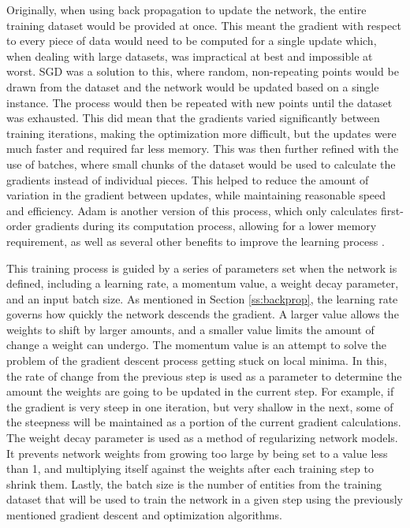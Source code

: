 \documentclass[11pt,a4paper,oldfontcommands]{memoir}
\begin{document}
Originally, when using back propagation to update the network, the entire training dataset would be provided at once. This meant the gradient with respect to every piece of data would need to be computed for a single update which, when dealing with large datasets, was impractical at best and impossible at worst. SGD was a solution to this, where random, non-repeating points would be drawn from the dataset and the network would be updated based on a single instance. The process would then be repeated with new points until the dataset was exhausted. This did mean that the gradients varied significantly between training iterations, making the optimization more difficult, but the updates were much faster and required far less memory. This was then further refined with the use of batches, where small chunks of the dataset would be used to calculate the gradients instead of individual pieces. This helped to reduce the amount of variation in the gradient between updates, while maintaining reasonable speed and efficiency. Adam is another version of this process, which only calculates first-order gradients during its computation process, allowing for a lower memory requirement, as well as several other benefits to improve the learning process \cite{adam}.

This training process is guided by a series of parameters set when the network is defined, including a learning rate, a momentum value, a weight decay parameter, and an input batch size. As mentioned in Section \ref{ss:backprop}, the learning rate governs how quickly the network descends the gradient. A larger value allows the weights to shift by larger amounts, and a smaller value limits the amount of change a weight can undergo. The momentum value is an attempt to solve the problem of the gradient descent process getting stuck on local minima. In this, the rate of change from the previous step is used as a parameter to determine the amount the weights are going to be updated in the current step. For example, if the gradient is very steep in one iteration, but very shallow in the next, some of the steepness will be maintained as a portion of the current gradient calculations. The weight decay parameter is used as a method of regularizing network models. It prevents network weights from growing too large by being set to a value less than 1, and multiplying itself against the weights after each training step to shrink them. Lastly, the batch size is the number of entities from the training dataset that will be used to train the network in a given step using the previously mentioned gradient descent and optimization algorithms.  
\end{document}
